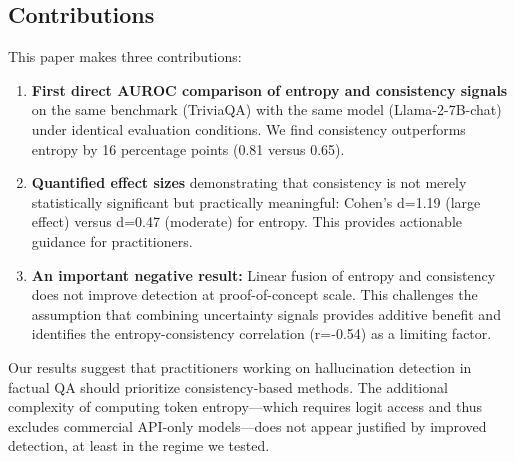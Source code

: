 \subsection{Contributions}

This paper makes three contributions:

\begin{enumerate}
    \item \textbf{First direct AUROC comparison of entropy and consistency signals} on the same benchmark (TriviaQA) with the same model (Llama-2-7B-chat) under identical evaluation conditions. We find consistency outperforms entropy by 16 percentage points (0.81 versus 0.65).

    \item \textbf{Quantified effect sizes} demonstrating that consistency is not merely statistically significant but practically meaningful: Cohen's d=1.19 (large effect) versus d=0.47 (moderate) for entropy. This provides actionable guidance for practitioners.

    \item \textbf{An important negative result:} Linear fusion of entropy and consistency does not improve detection at proof-of-concept scale. This challenges the assumption that combining uncertainty signals provides additive benefit and identifies the entropy-consistency correlation (r=-0.54) as a limiting factor.
\end{enumerate}

Our results suggest that practitioners working on hallucination detection in factual QA should prioritize consistency-based methods. The additional complexity of computing token entropy---which requires logit access and thus excludes commercial API-only models---does not appear justified by improved detection, at least in the regime we tested.
